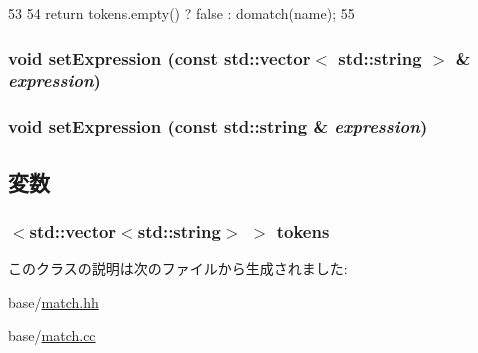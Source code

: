 \begin{DoxyCode}
53     {
54         return tokens.empty() ? false : domatch(name);
55     }
\end{DoxyCode}
\hypertarget{classObjectMatch_a019c722622adbdaa35fb6764f447224f}{
\subsubsection[{setExpression}]{\setlength{\rightskip}{0pt plus 5cm}void setExpression (const {\bf std::vector}$<$ std::string $>$ \& {\em expression})}}
\label{classObjectMatch_a019c722622adbdaa35fb6764f447224f}
\hypertarget{classObjectMatch_aaafb5de2cb9659506c901bafcd628ce7}{
\subsubsection[{setExpression}]{\setlength{\rightskip}{0pt plus 5cm}void setExpression (const std::string \& {\em expression})}}
\label{classObjectMatch_aaafb5de2cb9659506c901bafcd628ce7}


\subsection{変数}
\hypertarget{classObjectMatch_a7e8524ce152410efd3043e8074899e97}{
\subsubsection[{tokens}]{$<${\bf std::vector}$<$std::string$>$ $>$ {\bf tokens}}}
\label{classObjectMatch_a7e8524ce152410efd3043e8074899e97}


このクラスの説明は次のファイルから生成されました:\begin{DoxyCompactItemize}
\item 
base/\hyperlink{match_8hh}{match.hh}\item 
base/\hyperlink{match_8cc}{match.cc}\end{DoxyCompactItemize}

